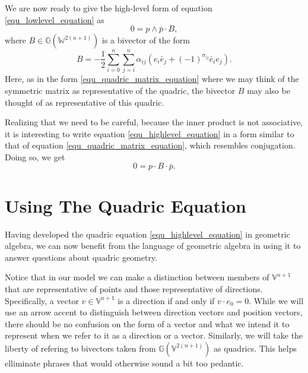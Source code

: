 \documentclass{ecgd-l}
\theoremstyle{definition}
\theoremstyle{remark}
\numberwithin{equation}{section}
\newcommand{\G}{\mathbb{G}}
\newcommand{\V}{\mathbb{V}}
\newcommand{\W}{\mathbb{W}}
\begin{document}
We are now ready to give the high-level form of equation \eqref{equ_lowlevel_equation} as
\begin{equation}\label{equ_highlevel_equation}
0 = p\wedge\bar{p}\cdot B,
\end{equation}
where $B\in\G(\W^{2(n+1)})$ is a bivector of the form
\begin{equation}
B = -\frac{1}{2}\sum_{i=0}^n\sum_{j=i}^n\alpha_{ij}(e_i\bar{e}_j+(-1)^{\sigma_{ij}}\bar{e}_ie_j).
\end{equation}
Here, as in the form \eqref{equ_quadric_matrix_equation} where we may think of
the symmetric matrix as representative of the quadric, the bivector $B$ may also be thought
of as representative of this quadric.

Realizing that we need to be careful, because the inner product is not associative,
it is interesting to write equation \eqref{equ_highlevel_equation} in a form
similar to that of equation \eqref{equ_quadric_matrix_equation}, which
resembles conjugation.  Doing so, we get
\begin{equation}
0 = p\cdot B\cdot\overline{p}.
\end{equation}

\section{Using The Quadric Equation}

Having developed the quadric equation \eqref{equ_highlevel_equation} in geometric algebra, we can
now benefit from the language of geometric algebra in using it to answer questions about quadric geometry.

Notice that in our model we can make a distinction between members of $\V^{n+1}$ that are
representative of points and those representative of directions.  Specifically, a vector $v\in\V^{n+1}$
is a direction if and only if $v\cdot e_0=0$.  While we will use an arrow accent to distinguish
between direction vectors and position vectors, there should be no confusion on the form
of a vector and what we intend it to represent when we refer to it as a direction or a vector.
Similarly, we will take the liberty of refering to bivectors taken
from $\G(\V^{2(n+1)})$ as quadrics.  This helps elliminate phrases that would otherwise sound a bit
too pedantic.
\end{document}
